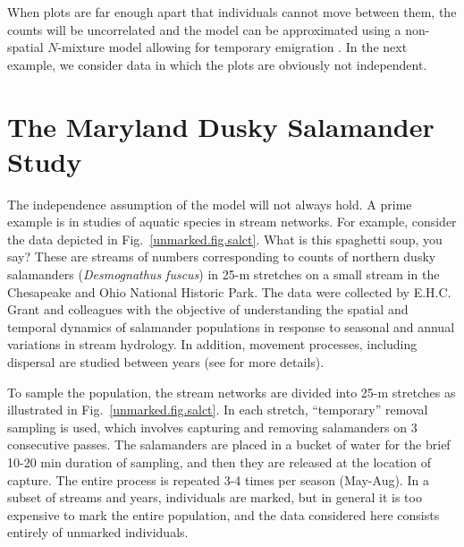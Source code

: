When plots are far enough apart that
individuals cannot move between them, the counts will be uncorrelated
and the model can be approximated using a non-spatial $N$-mixture model
allowing for temporary emigration \citep{chandler_etal:2011}.
In the next example, we consider data in which the plots are obviously
not independent.


\section{The Maryland Dusky Salamander Study}
The independence assumption of the \citet{chandler_etal:2011} model
will not always hold. A prime example is in studies of aquatic
species in stream networks. For example, consider the data depicted in
Fig.~\ref{unmarked.fig.salct}. What is this spaghetti soup, you say?
These
are streams of numbers corresponding to counts of northern dusky salamanders
(\textit{Desmognathus fuscus}) in 25-m stretches on a small stream in the Chesapeake and
Ohio National Historic Park. The data were collected by E.H.C. Grant
and colleagues with the objective of understanding the spatial and
temporal dynamics of salamander populations in response to seasonal
and annual variations in stream
hydrology. In addition, movement processes, including dispersal are
studied between years (see \citet{grant_etal:2010} for more
details).

To sample the population, the stream networks are divided into 25-m
stretches %
as illustrated in Fig.~\ref{unmarked.fig.salct}. In each
stretch, ``temporary'' removal sampling is used, which involves
capturing and removing salamanders on 3 consecutive passes. The
salamanders are placed in a bucket of water for the brief 10-20 min
duration of sampling, and then they are released at the location of
capture. The entire process is repeated 3-4 times per season (May-Aug).
In a subset of streams and years, individuals
are marked, but in general it is too expensive to mark the entire
population, and the data considered here consists entirely of unmarked individuals.

